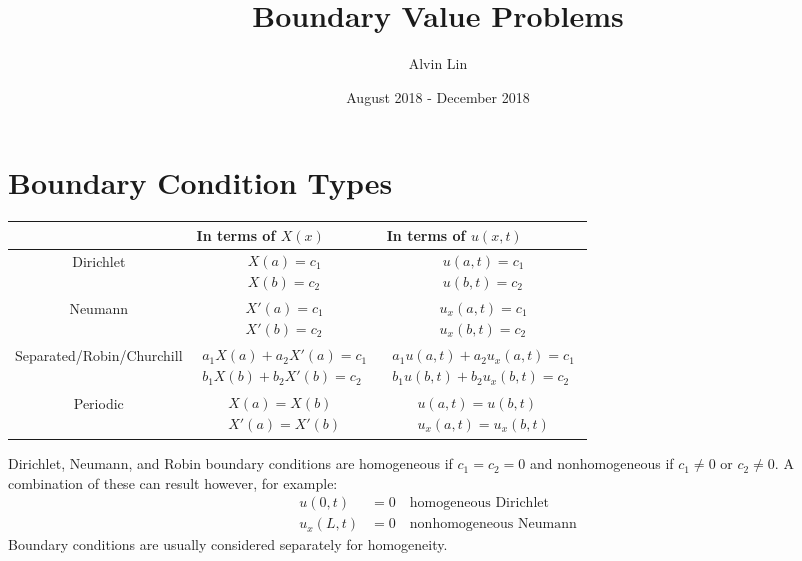 \documentclass{math}
\title{Boundary Value Problems}
\author{Alvin Lin}
\date{August 2018 - December 2018}
\begin{document}
\maketitle

\section*{Boundary Condition Types}
\begin{center}
  \begin{tabular}{|c|p{4cm}|p{4cm}|}
    \hline
    & In terms of \( X(x) \) & In terms of \( u(x,t) \) \\
    \hline
    Dirichlet & \begin{align*}
      X(a) = c_1 \\
      X(b) = c_2
    \end{align*} & \begin{align*}
      u(a,t) = c_1 \\
      u(b,t) = c_2
    \end{align*} \\
    \hline
    Neumann & \begin{align*}
      X'(a) = c_1 \\
      X'(b) = c_2
    \end{align*} & \begin{align*}
      u_x(a,t) = c_1 \\
      u_x(b,t) = c_2
    \end{align*} \\
    \hline
    Separated/Robin/Churchill & \begin{align*}
      a_1X(a)+a_2X'(a) = c_1 \\
      b_1X(b)+b_2X'(b) = c_2
    \end{align*} & \begin{align*}
      a_1u(a,t)+a_2u_x(a,t) = c_1 \\
      b_1u(b,t)+b_2u_x(b,t) = c_2
    \end{align*} \\
    \hline
    Periodic & \begin{align*}
      X(a) = X(b) \\
      X'(a) = X'(b)
    \end{align*} & \begin{align*}
      u(a,t) = u(b,t) \\
      u_x(a,t) = u_x(b,t)
    \end{align*} \\
    \hline
  \end{tabular}
\end{center}
Dirichlet, Neumann, and Robin boundary conditions are homogeneous if
\( c_1 = c_2 = 0 \) and nonhomogeneous if \( c_1 \ne 0 \) or \( c_2 \ne 0 \).
A combination of these can result however, for example:
\begin{align*}
  u(0,t) &= 0 \quad \text{homogeneous Dirichlet} \\
  u_x(L,t) &= 0 \quad \text{nonhomogeneous Neumann}
\end{align*}
Boundary conditions are usually considered separately for homogeneity.
\end{document}
